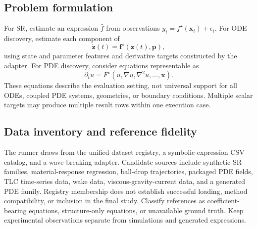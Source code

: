 \documentclass[11pt,a4paper]{article}
\begin{document}
\subsection{Problem formulation}
For SR, estimate an expression $\hat f$ from observations
$y_i=f^\star(\mathbf{x}_i)+\epsilon_i$.
For ODE discovery, estimate each component of
\begin{equation}
  \dot{\mathbf{z}}(t)=\mathbf{f}^\star(\mathbf{z}(t),\mathbf{p}),
\end{equation}
using state and parameter features and derivative targets constructed by the
adapter. For PDE discovery, consider equations representable as
\begin{equation}
  \partial_t u=F^\star(u,\nabla u,\nabla^2u,\ldots,\mathbf{x}).
\end{equation}
These equations describe the evaluation setting, not universal support for all
ODEs, coupled PDE systems, geometries, or boundary conditions. Multiple scalar
targets may produce multiple result rows within one execution case.

\subsection{Data inventory and reference fidelity}
The runner draws from the unified dataset registry, a symbolic-expression CSV
catalog, and a wave-breaking adapter. Candidate sources include synthetic SR
families, material-response regression, ball-drop trajectories, packaged PDE
fields, TLC time-series data, wake data, viscous-gravity-current data, and a
generated PDE family. Registry membership does not establish successful loading,
method compatibility, or inclusion in the final study.
Classify references as coefficient-bearing equations, structure-only equations,
or unavailable ground truth. Keep experimental observations separate from
simulations and generated expressions.
\end{document}
